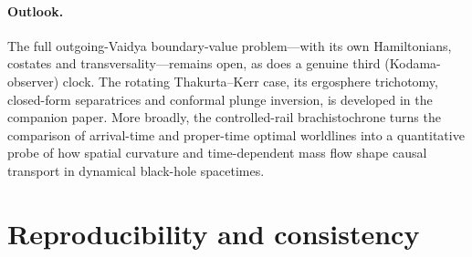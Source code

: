 \documentclass[12pt]{iopart}
\begin{document}
\paragraph{Outlook.} The full outgoing-Vaidya boundary-value problem---with its own
Hamiltonians, costates and transversality---remains open, as does a genuine third
(Kodama-observer) clock. The rotating Thakurta--Kerr case, its ergosphere trichotomy,
closed-form separatrices and conformal plunge inversion, is developed in the companion
paper. More broadly, the controlled-rail brachistochrone turns the comparison of
arrival-time and proper-time optimal worldlines into a quantitative probe of how spatial
curvature and time-dependent mass flow shape causal transport in dynamical black-hole
spacetimes.


\appendix
\section{Reproducibility and consistency}
\label{app:validation}
\end{document}

